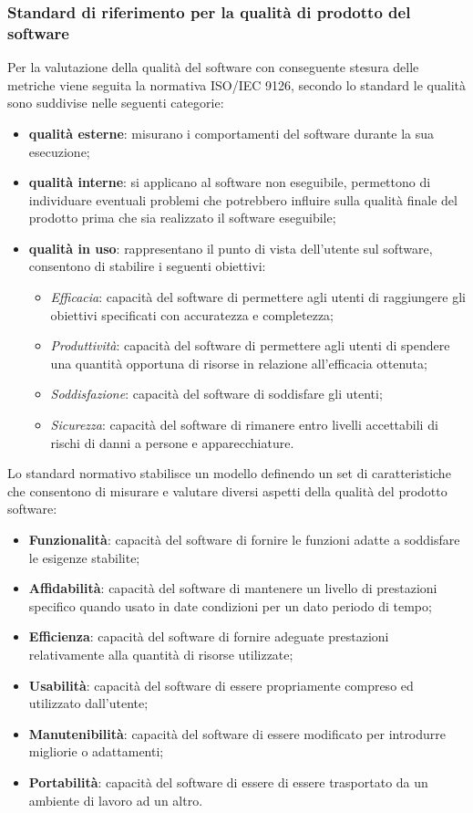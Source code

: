 \subsubsection{Standard di riferimento per la qualità di prodotto del software}
Per la valutazione della qualità del software con conseguente stesura delle metriche viene seguita la normativa ISO/IEC 9126, secondo lo standard le qualità sono suddivise nelle seguenti categorie:
\begin{itemize}
    \item \textbf{qualità esterne}: misurano i comportamenti del software durante la sua esecuzione;
    \item \textbf{qualità interne}: si applicano al software non eseguibile, permettono di individuare eventuali problemi che potrebbero influire sulla qualità finale del prodotto prima che sia realizzato il software eseguibile;
    \item \textbf{qualità in uso}: rappresentano il punto di vista dell'utente sul software, consentono di stabilire i seguenti obiettivi:
    \begin{itemize}
        \item \textit{Efficacia}: capacità del software di permettere agli utenti di raggiungere gli obiettivi specificati con accuratezza e completezza;
        \item \textit{Produttività}: capacità del software di permettere agli utenti di spendere una quantità opportuna di risorse in relazione all'efficacia ottenuta;
        \item \textit{Soddisfazione}: capacità del software di soddisfare gli utenti;
        \item \textit{Sicurezza}: capacità del software di rimanere entro livelli accettabili di rischi di danni a persone e apparecchiature.
    \end{itemize}
\end{itemize}
Lo standard normativo stabilisce un modello definendo un set di caratteristiche che consentono di misurare e valutare diversi aspetti della qualità del prodotto software:
\begin{itemize}
    \item \textbf{Funzionalità}: capacità del software di fornire le funzioni adatte a soddisfare le esigenze stabilite;
    \item \textbf{Affidabilità}: capacità del software di mantenere un livello di prestazioni specifico quando usato in date condizioni per un dato periodo di tempo;
    \item \textbf{Efficienza}: capacità del software di fornire adeguate prestazioni relativamente alla quantità di risorse utilizzate;
    \item \textbf{Usabilità}: capacità del software di essere propriamente compreso ed utilizzato dall'utente;
    \item \textbf{Manutenibilità}: capacità del software di essere modificato per introdurre migliorie o adattamenti;
    \item \textbf{Portabilità}: capacità del software di essere di essere trasportato da un ambiente di lavoro ad un altro.
\end{itemize}
